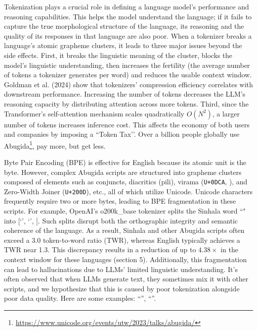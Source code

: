 Tokenization plays a crucial role in defining a language model's performance\cite{ali2024tokenizer} and reasoning capabilities. This helps the model understand the language; if it fails to capture the true morphological structure of the language, its reasoning and the quality of its responses in that language are also poor. When a tokenizer breaks a language's atomic grapheme clusters, it leads to three major issues beyond the side effects. First, it breaks the linguistic meaning of the cluster, blocks the model’s linguistic understanding, then increases the fertility (the average number of tokens a tokenizer generates per word) and reduces the usable context window. Goldman et al. (2024) show that tokenizers’ compression efficiency correlates with downstream performance\cite{goldman2024unpacking}. Increasing the number of tokens decreases the LLM's reasoning capacity by distributing attention across more tokens. Third, since the Transformer's self-attention mechanism scales quadratically $O(N^2)$, a larger number of tokens increases inference cost. This affects the economy of both users and companies by imposing a ``Token Tax’’\cite{ahia2023all, petrov2023language}. Over a billion people globally use Abugida\footnote{\url{https://www.unicode.org/events/utw/2023/talks/abugida/}}, pay more, but get less. 

Byte Pair Encoding (BPE)\cite{gage1994bpe, sennrich2016neural} is effective for English because its atomic unit is the byte. However, complex Abugida scripts are structured into grapheme clusters composed of elements such as conjuncts, diacritics (pili), virama (\texttt{U+0DCA}, ), and Zero-Width Joiner (\texttt{U+200D}), etc., all of which utilize Unicode. Unicode characters frequently require two or more bytes, leading to BPE fragmentation in these scripts. For example, OpenAI's o200k\_base tokenizer splits the Sinhala word ``" into [`', `', ]. Such splits disrupt both the orthographic integrity and semantic coherence of the language. As a result, Sinhala and other Abugida scripts often exceed a 3.0 token-to-word ratio (TWR), whereas English typically achieves a TWR near 1.3. This discrepancy results in a reduction of up to $4.38\times$ in the context window for these languages (section 5). Additionally, this fragmentation can lead to hallucinations due to LLMs' limited linguistic understanding. It's often observed that when LLMs generate text, they sometimes mix it with other scripts, and we hypothesize that this is caused by poor tokenization alongside poor data quality. Here are some examples: ``'', ``''.


